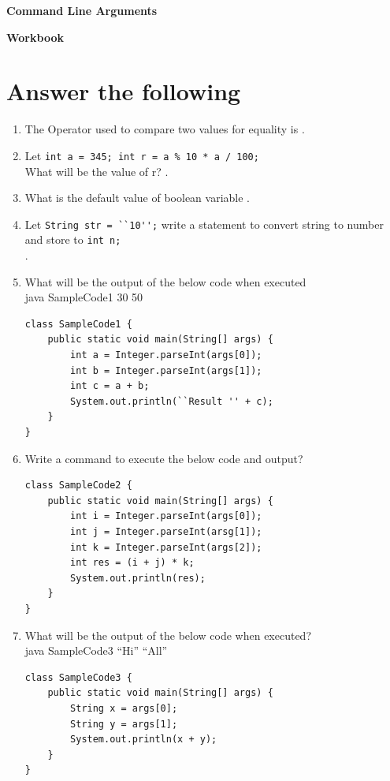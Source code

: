 \documentclass[11pt,a4paper]{article}
\def\AnswerBox{\fbox{\begin{minipage}{4in}\hfill\vspace{0.5in}\end{minipage}}}
\begin{document}
\centerline{\huge{ \textbf{Command Line Arguments}}}
\vspace{1pc}
\centerline{\Large{ \textbf{Workbook}}}
\section*{Answer the following}

\begin{enumerate}
\item The Operator used to compare two values for equality is \underline{\hspace{5cm}}.
\item Let \lstinline!int a = 345; int r = a % 10 * a / 100;!\\
What will be the value of r? \underline{\hspace{5cm}}.
\item What is the default value of boolean variable \underline{\hspace{5cm}}.   
\item Let \lstinline!String str = ``10'';! write a statement to convert string to number and store to \lstinline!int n;!\\
\underline{\hspace{5cm}}.
\item What will be the output of the below code when executed\\
    java SampleCode1 30 50
\begin{lstlisting}
class SampleCode1 {
    public static void main(String[] args) {
        int a = Integer.parseInt(args[0]);
        int b = Integer.parseInt(args[1]);
        int c = a + b;
        System.out.println(``Result '' + c);
    }
}
\end{lstlisting}
\AnswerBox

\item Write a command to execute the below code and output?
\begin{lstlisting}
class SampleCode2 {
    public static void main(String[] args) {
        int i = Integer.parseInt(args[0]);
        int j = Integer.parseInt(arsg[1]);
        int k = Integer.parseInt(args[2]);
        int res = (i + j) * k;
        System.out.println(res);
    }
}
\end{lstlisting}
\AnswerBox
\item What will be the output of the below code when executed?\\
    java SampleCode3 ``Hi'' ``All''
\begin{lstlisting}
class SampleCode3 {
    public static void main(String[] args) {
        String x = args[0];
        String y = args[1];
        System.out.println(x + y);
    }
}
\end{lstlisting}
\AnswerBox
\end{enumerate}
\end{document}
